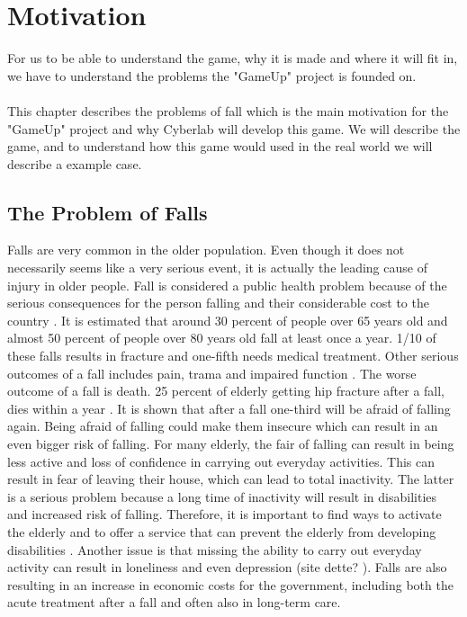 \chapter{Motivation}
For us to be able to understand the game, why it is made and where it will fit in, we have to understand the problems the "GameUp" project is founded on.  \\ \\
This chapter describes the problems of fall which is the main motivation for the "GameUp" project and why Cyberlab will develop this game. We will describe the game, and to understand how this game would used in the real world we will describe a example case.   

\section{The Problem of Falls}
Falls are very common in the older population. Even though it does not necessarily seems like a very serious event, it is actually the leading cause of injury in older people.  Fall is considered a public health problem because of the serious consequences for the person falling and their considerable cost to the country \cite{otago}.
It is estimated that around 30 percent of people over 65 years old and almost 50 percent of people over 80 years old fall at least once a year. 1/10 of these falls results in fracture and one-fifth needs medical treatment. Other serious outcomes of a fall includes pain, trama and impaired function \cite{otago}.  The worse outcome of a fall is death. 25 percent of elderly getting hip fracture after a fall, dies within a year \cite{gruppetrening-trheim} \cite{larhalsbrudd}. It is shown that after a fall one-third will be afraid of falling again. Being afraid of falling could make them insecure which can result in an even bigger risk of falling. For many elderly, the fair of falling can result in being less active and loss of confidence in carrying out everyday activities. This can result in fear of leaving their house, which can lead to total inactivity. The latter is a serious problem because a long time of inactivity will result in disabilities and increased risk of falling. Therefore, it is important to find ways to activate the elderly and to offer a service that can prevent the elderly from developing disabilities \cite{gruppetrening-trheim}. Another issue is that missing the ability to carry out everyday activity can result in loneliness and even depression (site dette? ). Falls are also resulting in an increase in economic costs for the government, including both the acute treatment after a fall and often also in long-term care. \cite{otago}\\ \\

